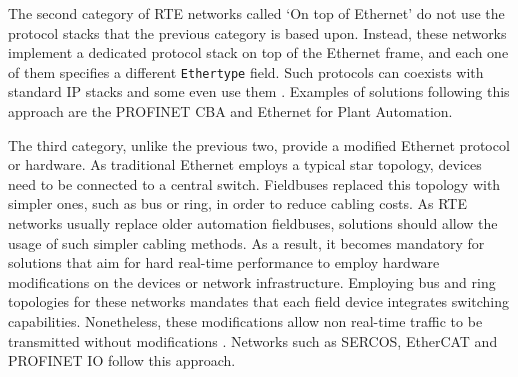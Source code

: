 The second category of RTE networks called `On top of Ethernet' do not use the protocol stacks that the previous category is based upon.
Instead, these networks implement a dedicated protocol stack on top of the Ethernet frame, and each one of them specifies a different \verb|Ethertype| field.
Such protocols can coexists with standard IP stacks and some even use them \cite{rte:rte-for-automation}.
Examples of solutions following this approach are the PROFINET CBA and Ethernet for Plant Automation.

The third category, unlike the previous two, provide a modified Ethernet protocol or hardware.
As traditional Ethernet employs a typical star topology, devices need to be connected to a central switch.
Fieldbuses replaced this topology with simpler ones, such as bus or ring, in order to reduce cabling costs.
As RTE networks usually replace older automation fieldbuses, solutions should allow the usage of such simpler cabling methods.
As a result, it becomes mandatory for solutions that aim for hard real-time performance to employ hardware modifications on the devices or network infrastructure.
Employing bus and ring topologies for these networks mandates that each field device integrates switching capabilities.
Nonetheless, these modifications allow non real-time traffic to be transmitted without modifications \cite{rte:rte-for-automation}.
Networks such as SERCOS, EtherCAT \cite{protocol:ethercat} and PROFINET IO \cite{protocol:profinet} follow this approach.
